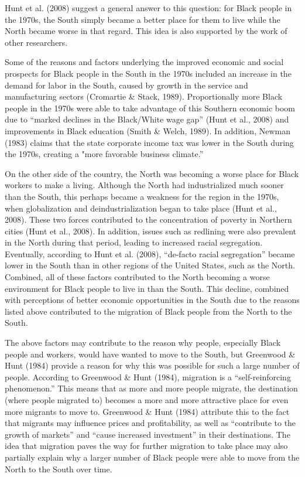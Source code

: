 \documentclass[12pt]{article}
\begin{document}
Hunt et al. (2008) suggest a general answer to this question: for Black people in the 1970s, the South simply became a better place for them to live while the North became worse in that regard. This idea is also supported by the work of other researchers. 

Some of the reasons and factors underlying the improved economic and social prospects for Black people in the South in the 1970s included an increase in the demand for labor in the South, caused by growth in the service and manufacturing sectors (Cromartie \& Stack, 1989). Proportionally more Black people in the 1970s were able to take advantage of this Southern economic boom due to “marked declines in the Black/White wage gap” (Hunt et al., 2008) and improvements in Black education (Smith \& Welch, 1989). In addition, Newman (1983) claims that the state corporate income tax was lower in the South during the 1970s, creating a "more favorable business climate.” 

On the other side of the country, the North was becoming a worse place for Black workers to make a living. Although the North had industrialized much sooner than the South, this perhaps became a weakness for the region in the 1970s, when globalization and deindustrialization began to take place (Hunt et al., 2008). These two forces contributed to the concentration of poverty in Northern cities (Hunt et al., 2008). In addition, issues such as redlining were also prevalent in the North during that period, leading to increased racial segregation. Eventually, according to Hunt et al. (2008), “de-facto racial segregation” became lower in the South than in other regions of the United States, such as the North. Combined, all of these factors contributed to the North becoming a worse environment for Black people to live in than the South. This decline, combined with perceptions of better economic opportunities in the South due to the reasons listed above contributed to the migration of Black people from the North to the South. 

The above factors may contribute to the reason why people, especially Black people and workers, would have wanted to move to the South, but Greenwood \& Hunt (1984) provide a reason for why this was possible for such a large number of people. According to Greenwood \& Hunt (1984), migration is a “self-reinforcing phenomenon.” This means that as more and more people migrate, the destination (where people migrated to) becomes a more and more attractive place for even more migrants to move to. Greenwood \& Hunt (1984) attribute this to the fact that migrants may influence prices and profitability, as well as “contribute to the growth of markets” and “cause increased investment” in their destinations. The idea that migration paves the way for further migration to take place may also partially explain why a larger number of Black people were able to move from the North to the South over time. 
\end{document}

